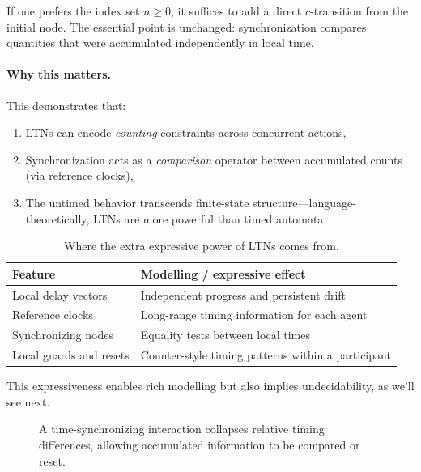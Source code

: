 If one prefers the index set $n\ge 0$, it suffices to add a direct
$c$-transition from the initial node.  The essential point is unchanged:
synchronization compares quantities that were accumulated independently in local
time.

\paragraph{Why this matters.} This demonstrates that:
\begin{enumerate}
\item LTNs can encode \emph{counting} constraints across concurrent actions,
\item Synchronization acts as a \emph{comparison} operator between accumulated counts (via reference clocks),
\item The untimed behavior transcends finite-state structure—language-theoretically, LTNs are more powerful than timed automata.
\end{enumerate}

\begin{table}[t]
\centering
\begin{tabular}{ll}
\hline
\textbf{Feature} & \textbf{Modelling / expressive effect} \\ \hline
Local delay vectors & Independent progress and persistent drift \\
Reference clocks & Long-range timing information for each agent \\
Synchronizing nodes & Equality tests between local times \\
Local guards and resets & Counter-style timing patterns within a participant \\ \hline
\end{tabular}
\caption{Where the extra expressive power of LTNs comes from.}
\label{tab:ltn-expressiveness}
\end{table}

This expressiveness enables rich modelling but also implies undecidability, as we'll see next.

\begin{figure}[t]
\centering
{}
\caption{A time-synchronizing interaction collapses relative timing differences,
allowing accumulated information to be compared or reset.}
\label{fig:selective-sync}
\end{figure}

